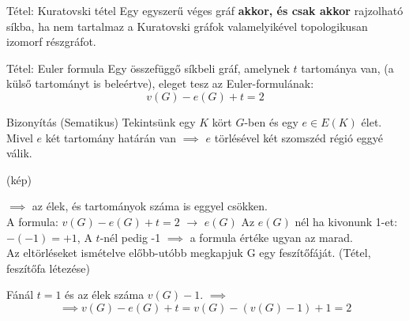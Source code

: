 \documentclass{beamer}
\begin{document}
\begin{frame}
\begin{block}{Tétel: Kuratovski tétel}
Egy egyszerű véges gráf \textbf{akkor, és csak akkor} rajzolható síkba, ha nem tartalmaz a Kuratovski gráfok valamelyikével topologikusan izomorf részgráfot.

\end{block}

\end{frame}

\begin{frame}

\begin{block}{Tétel: Euler formula}
Egy összefüggő síkbeli gráf, amelynek $t$ tartománya van, (a külső tartományt is beleértve), eleget tesz az Euler-formulának:
$$v(G) - e(G) + t = 2$$

\end{block}

\begin{block}{Bizonyítás (Sematikus)}
Tekintsünk egy $K$ kört $G$-ben és egy $e \in E(K)$ élet.\\
Mivel $e$ két tartomány határán van $\implies$ $e$ törlésével két szomszéd régió eggyé válik.

(kép)

$\implies$ az élek, és tartományok száma is eggyel csökken.\\
A formula: $v(G) - e(G) + t = 2$ $\rightarrow$ $e(G)$ Az $e(G)$ nél ha kivonunk 1-et: $-(-1) = +1$, A $t$-nél pedig -1 $\implies$ a formula értéke ugyan az marad.\\

Az eltörléseket ismételve előbb-utóbb megkapjuk G egy feszítőfáját. (Tétel, feszítőfa létezése)

Fánál $t = 1$ és az élek száma $v(G) - 1$. $\implies$
$$\implies v(G) - e(G) + t = v(G) - (v(G) - 1) + 1 = 2$$

\end{block}
\end{frame}
\end{document}

